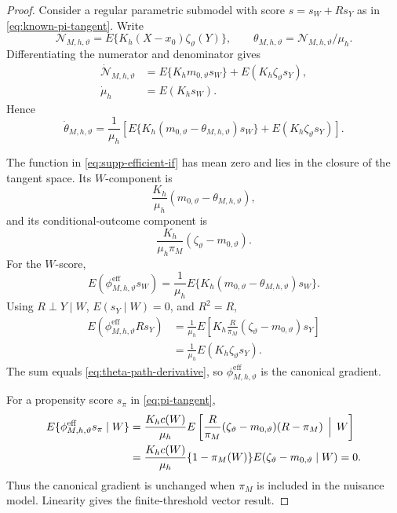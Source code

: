 \begin{proof}
Consider a regular parametric submodel with score \(s=s_W+Rs_Y\) as in \eqref{eq:known-pi-tangent}. Write
\[
\mathcal N_{M,h,\vartheta}
=
E\{K_h(X-x_0)\zeta_\vartheta(Y)\},
\qquad
\theta_{M,h,\vartheta}=\mathcal N_{M,h,\vartheta}/\mu_h.
\]
Differentiating the numerator and denominator gives
\begin{align}
\dot{\mathcal N}_{M,h,\vartheta}
&=
E\{K_hm_{0,\vartheta}s_W\}
+
E(K_h\zeta_\vartheta s_Y),
\label{eq:num-path-derivative}\\
\dot\mu_h
&=E(K_hs_W).
\label{eq:den-path-derivative}
\end{align}
Hence
\begin{equation}
\dot\theta_{M,h,\vartheta}
=
\frac1{\mu_h}
\left[
E\{K_h(m_{0,\vartheta}-\theta_{M,h,\vartheta})s_W\}
+
E(K_h\zeta_\vartheta s_Y)
\right].
\label{eq:theta-path-derivative}
\end{equation}

The function in \eqref{eq:supp-efficient-if} has mean zero and lies in the closure of the tangent space. Its \(W\)-component is
\[
\frac{K_h}{\mu_h}(m_{0,\vartheta}-\theta_{M,h,\vartheta}),
\]
and its conditional-outcome component is
\[
\frac{K_h}{\mu_h\pi_M}(\zeta_\vartheta-m_{0,\vartheta}).
\]
For the \(W\)-score,
\[
E(\phi_{M,h,\vartheta}^{\mathrm{eff}}s_W)
=
\frac1{\mu_h}
E\{K_h(m_{0,\vartheta}-\theta_{M,h,\vartheta})s_W\}.
\]
Using \(R\perp Y\mid W\), \(E(s_Y\mid W)=0\), and \(R^2=R\),
\begin{align*}
E(\phi_{M,h,\vartheta}^{\mathrm{eff}}R s_Y)
&=
\frac1{\mu_h}
E\left[
K_h\frac{R}{\pi_M}(\zeta_\vartheta-m_{0,\vartheta})s_Y
\right]\\
&=
\frac1{\mu_h}E(K_h\zeta_\vartheta s_Y).
\end{align*}
The sum equals \eqref{eq:theta-path-derivative}, so \(\phi_{M,h,\vartheta}^{\mathrm{eff}}\) is the canonical gradient.

For a propensity score \(s_\pi\) in \eqref{eq:pi-tangent},
\begin{align*}
E\{\phi_{M,h,\vartheta}^{\mathrm{eff}}s_\pi\mid W\}
&=
\frac{K_hc(W)}{\mu_h}
E\left[
\frac{R}{\pi_M}(\zeta_\vartheta-m_{0,\vartheta})(R-\pi_M)
\,\Bigm|\,W
\right]\\
&=
\frac{K_hc(W)}{\mu_h}
\{1-\pi_M(W)\}
E(\zeta_\vartheta-m_{0,\vartheta}\mid W)
=0.
\end{align*}
Thus the canonical gradient is unchanged when \(\pi_M\) is included in the nuisance model. Linearity gives the finite-threshold vector result.
\end{proof}

